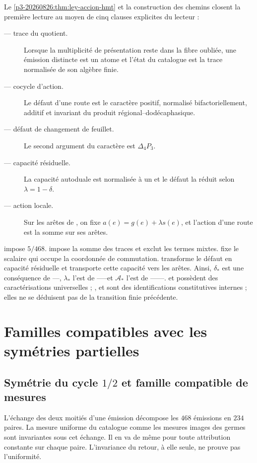 Le \cref{p3-20260826:thm:ley-accion-hmt} et la construction des chemins closent la première
lecture au moyen de cinq clauses explicites du lecteur :
\begin{description}
  \item[\HTr --- trace du quotient.] Lorsque la multiplicité de présentation
  reste dans la fibre oubliée, une émission distincte est un atome et
  l’état du catalogue est la trace normalisée de son algèbre finie.
  \item[\HAdd --- cocycle d’action.] Le défaut d’une route est le caractère
  positif, normalisé bifactoriellement, additif et invariant du produit
  régional--dodécaphasique.
  \item[\HDef --- défaut de changement de feuillet.] Le second argument du caractère est
  \(\Delta_4P_3\).
  \item[\HRes --- capacité résiduelle.] La capacité autoduale est normalisée à
  un et le défaut la réduit selon \(\lambda=1-\delta\).
  \item[\HLoc --- action locale.] Sur les arêtes de \Gtr, on fixe
  \(a(e)=g(e)+\lambda s(e)\), et l’action d’une route est la somme sur ses
  arêtes.
\end{description}
\HTr impose \(5/468\). \HAdd impose la somme des traces et exclut les termes
mixtes. \HDef fixe le scalaire qui occupe la coordonnée de commutation. \HRes transforme
le défaut en capacité résiduelle et \HLoc transporte cette capacité vers les arêtes.
Ainsi, \(\delta_*\) est une conséquence de \HTr--\HAdd--\HDef, \(\lambda_*\) l’est de
\HTr--\HAdd--\HDef--\HRes et \(\mathcal A_*\) l’est de
\HTr--\HAdd--\HDef--\HRes--\HLoc. \HTr et \HAdd possèdent des caractérisations universelles ; \HDef, \HRes et
\HLoc sont des identifications constitutives internes ; elles ne se déduisent pas de la
transition finie précédente.

\section{Familles compatibles avec les symétries partielles}

\subsection{Symétrie du cycle \(1/2\) et famille compatible de mesures}

L’échange des deux moitiés d’une émission décompose les \(468\)
émissions en \(234\) paires. La mesure uniforme du catalogue comme les
mesures images des germes sont invariantes sous cet échange. Il en va de même
pour toute attribution constante sur chaque paire. L’invariance du retour,
à elle seule, ne prouve pas l’uniformité.

